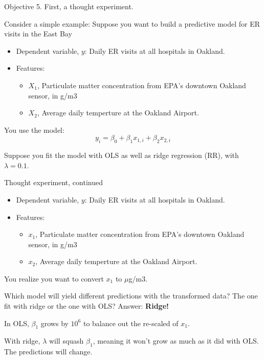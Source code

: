 \documentclass[mathserif, handout, aspectratio=169]{beamer}
\begin{document}
\begin{frame}{Objective 5.  First, a thought experiment.}

	Consider a simple example:  Suppose you want to build a predictive model for ER visits in the East Bay
	\begin{itemize}
		\item Dependent variable, $y$: Daily ER visits at all hospitals in Oakland.
		\item Features: 
			\begin{itemize}
				\item $X_1$, Particulate matter concentration from EPA's downtown Oakland sensor, in g/m3 
				\item $X_2$, Average daily temperture at the Oakland Airport.  
			\end{itemize}
	\end{itemize}

	You use the model:
	\begin{equation*}
		y_i = \beta_0 + \beta_1 x_{1,i} + \beta_2 x_{2,i}
	\end{equation*}

	Suppose you fit the model with OLS as well as ridge regression (RR), with $\lambda = 0.1$.    
\end{frame}

\begin{frame}{Thought experiment, continued}

	\begin{itemize}
		\item Dependent variable, $y$: Daily ER visits at all hospitals in Oakland.
		\item Features: 
			\begin{itemize}
				\item $x_1$, Particulate matter concentration from EPA's downtown Oakland sensor, in g/m3 
				\item $x_2$, Average daily temperture at the Oakland Airport.  
			\end{itemize}
	\end{itemize}

	You realize you want to convert $x_1$ to $\mu$g/m3.  

	\vspace{5mm}

	Which model will yield different predictions with the transformed data?  The one fit with ridge or the one with OLS? \pause Answer: \textbf{Ridge!}   
	\vspace{5mm}

	In OLS, $\beta_1$ grows by $10^6$ to balance out the re-scaled of $x_1$.  
	\vspace{5mm}

	With ridge, $\lambda$ will squash $\beta_1$, meaning it won't grow as much as it did with OLS.  The predictions will change.
\end{frame}
\end{document}
